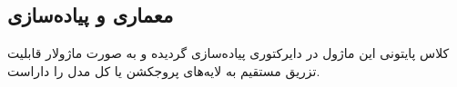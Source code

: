 \subsection{معماری و پیاده‌سازی}
کلاس پایتونی این ماژول در دایرکتوری  پیاده‌سازی گردیده و به صورت ماژولار قابلیت تزریق مستقیم به لایه‌های پروجکشن یا کل مدل را داراست.
